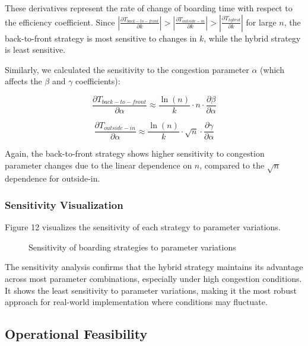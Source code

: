 These derivatives represent the rate of change of boarding time with respect to the efficiency coefficient. Since $|\frac{\partial T_{back-to-front}}{\partial k}| > |\frac{\partial T_{outside-in}}{\partial k}| > |\frac{\partial T_{hybrid}}{\partial k}|$ for large $n$, the back-to-front strategy is most sensitive to changes in $k$, while the hybrid strategy is least sensitive.

Similarly, we calculated the sensitivity to the congestion parameter $\alpha$ (which affects the $\beta$ and $\gamma$ coefficients):

\begin{equation}
\frac{\partial T_{back-to-front}}{\partial \alpha} \approx \frac{\ln(n)}{k} \cdot n \cdot \frac{\partial \beta}{\partial \alpha}
\end{equation}

\begin{equation}
\frac{\partial T_{outside-in}}{\partial \alpha} \approx \frac{\ln(n)}{k} \cdot \sqrt{n} \cdot \frac{\partial \gamma}{\partial \alpha}
\end{equation}

Again, the back-to-front strategy shows higher sensitivity to congestion parameter changes due to the linear dependence on $n$, compared to the $\sqrt{n}$ dependence for outside-in.

\subsubsection{Sensitivity Visualization}

Figure 12 visualizes the sensitivity of each strategy to parameter variations.

\begin{figure}[h]
\centering
\caption{Sensitivity of boarding strategies to parameter variations}
\label{fig:sensitivity_visualization}
\end{figure}

The sensitivity analysis confirms that the hybrid strategy maintains its advantage across most parameter combinations, especially under high congestion conditions. It shows the least sensitivity to parameter variations, making it the most robust approach for real-world implementation where conditions may fluctuate.

\subsection{Operational Feasibility}

